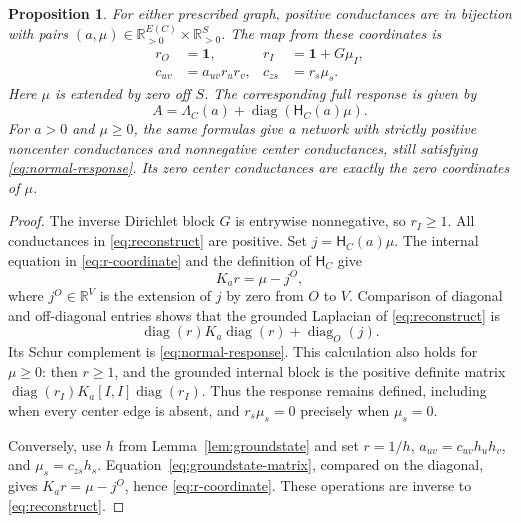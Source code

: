 \documentclass[11pt]{article}
\newtheorem{proposition}[theorem]{Proposition}
\theoremstyle{definition}
\newcommand{\one}{\mathbf 1}
\newcommand{\RR}{\mathbb R}
\newcommand{\diag}{\operatorname{diag}}
\newcommand{\exitmat}{\mathsf H}
\begin{document}
\begin{proposition}
\label{prop:normal-form}
For either prescribed graph, positive conductances are in bijection
with pairs $(a,\mu)\in\RR_{>0}^{E(C)}\times\RR_{>0}^{S}$.
The map from these coordinates is
\begin{align}
 r_O&=\one,& r_I&=\one+G\mu_I,\label{eq:r-coordinate}\\
 c_{uv}&=a_{uv}r_ur_v,& c_{zs}&=r_s\mu_s.
 \label{eq:reconstruct}
\end{align}
Here $\mu$ is extended by zero off $S$. The corresponding full
response is given by
\begin{equation}
 A=\Lambda_C(a)+\diag(\exitmat_C(a)\mu).
 \label{eq:normal-response}
\end{equation}
For $a>0$ and $\mu\ge0$, the same formulas give a network with
strictly positive noncenter conductances and nonnegative center
conductances, still satisfying \eqref{eq:normal-response}.
Its zero center conductances are exactly the zero coordinates of $\mu$.
\end{proposition}
\begin{proof}
The inverse Dirichlet block $G$ is entrywise nonnegative, so
$r_I\ge1$. All conductances in \eqref{eq:reconstruct} are positive.
Set $j=\exitmat_C(a)\mu$. The internal equation in
\eqref{eq:r-coordinate} and the definition of $\exitmat_C$ give
\[
 K_ar=\mu-j^O,
\]
where $j^O\in\RR^V$ is the extension of $j$ by zero from $O$ to $V$.
Comparison of diagonal and
off-diagonal entries shows that the grounded Laplacian of
\eqref{eq:reconstruct} is
\[
 \diag(r)K_a\diag(r)+\diag_O(j).
\]
Its Schur complement is \eqref{eq:normal-response}.
This calculation also holds for $\mu\ge0$: then $r\ge1$, and
the grounded internal block is the positive definite matrix
$\diag(r_I)K_a[I,I]\diag(r_I)$.
Thus the response remains defined, including when every center
edge is absent, and $r_s\mu_s=0$ precisely when $\mu_s=0$.

Conversely, use $h$ from Lemma~\ref{lem:groundstate} and set
$r=1/h$, $a_{uv}=c_{uv}h_uh_v$, and $\mu_s=c_{zs}h_s$.
Equation~\eqref{eq:groundstate-matrix}, compared on the diagonal,
gives $K_ar=\mu-j^O$, hence \eqref{eq:r-coordinate}.
These operations are inverse to \eqref{eq:reconstruct}.
\end{proof}
\end{document}

